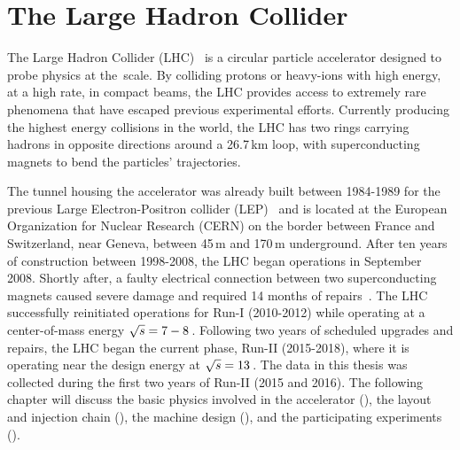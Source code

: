 \chapter{The Large Hadron Collider}
\label{ch:lhc}

The Large Hadron Collider (LHC)~\cite{LHC,LHC_design_v1,LHC_design_v2,LHC_design_v3} is a circular particle accelerator designed to probe physics at the \TeV\,scale. By colliding protons or heavy-ions with high energy, at a high rate, in compact beams, the LHC provides access to extremely rare phenomena that have escaped previous experimental efforts. Currently producing the highest energy collisions in the world, the LHC has two rings carrying hadrons in opposite directions around a 26.7\,km loop, with superconducting magnets to bend the particles' trajectories. 

The tunnel housing the accelerator was already built between 1984-1989 for the previous Large Electron-Positron collider (LEP)~\cite{LEP} and is located  at the European Organization for Nuclear Research (CERN) on the border between France and Switzerland, near Geneva, between 45\,m and 170\,m underground. After ten years of construction between 1998-2008, 
the LHC began operations in September 2008. Shortly after, a faulty electrical connection between two superconducting magnets caused severe damage and required 14 months of repairs~\cite{lhc_incident}.
The LHC successfully reinitiated operations for Run-I (2010-2012) while operating at a center-of-mass energy $\sqrt{s}=7-8$\,\TeV.
Following two years of scheduled upgrades and repairs, the LHC began the current phase, Run-II (2015-2018), where it is operating near the design energy at $\sqrt{s}=13$\,\TeV. The data in this thesis was collected during the first two years of Run-II (2015 and 2016). The following chapter will discuss the basic physics involved in the accelerator (\Sect{\ref{ch:lhc:acc}}), the layout and injection chain (\Sect{\ref{ch:lhc:inj}}), the machine design (\Sect{\ref{ch:lhc:des}}), and the participating experiments (\Sect{\ref{ch:lhc:exp}}).

